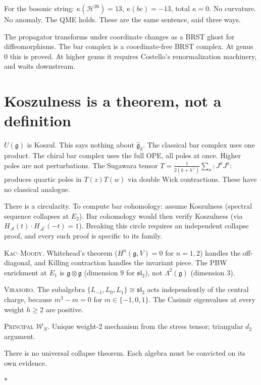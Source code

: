 \documentclass[11pt]{article}
\newcommand{\cA}{\mathcal{A}}
\newcommand{\cW}{\mathcal{W}}
\newcommand{\cH}{\mathcal{H}}
\newcommand{\fg}{\mathfrak{g}}
\newcommand{\fsl}{\mathfrak{sl}}
\newcommand{\normord}[1]{:\!#1\!:}
\newcommand{\sep}{\bigskip\begin{center}$*$\end{center}\medskip}
\begin{document}
For the bosonic string: $\kappa(\cH^{26}) = 13$,
$\kappa(bc) = -13$, total $\kappa = 0$.  No curvature.  No anomaly.
The QME holds.  These are the same sentence, said three ways.

The propagator transforms under coordinate changes as a BRST ghost
for diffeomorphisms.  The bar complex is a coordinate-free BRST
complex.  At genus~$0$ this is proved.  At higher genus it requires
Costello's renormalization machinery, and waits downstream.


\section{Koszulness is a theorem, not a definition}
\label{sec:koszulness}

$U(\fg)$ is Koszul.  This says nothing about $\widehat{\fg}_k$.
The classical bar complex uses one product.  The chiral bar complex
uses the full OPE, all poles at once.  Higher poles are not
perturbations.  The Sugawara tensor
$T = \frac{1}{2(k+h^\vee)}\sum_a \normord{J^a J^a}$ produces
quartic poles in $T(z)T(w)$ via double Wick contractions.  These
have no classical analogue.

There is a circularity.  To compute bar cohomology: assume Koszulness
(spectral sequence collapses at $E_2$).  Bar cohomology would then
verify Koszulness (via $H_\cA(t) \cdot H_{\cA^!}(-t) = 1$).
Breaking this circle requires an independent collapse proof, and
every such proof is specific to its family.

\textsc{Kac--Moody.}\enspace
Whitehead's theorem ($H^n(\fg, V) = 0$ for $n = 1,2$) handles
the off-diagonal, and Killing contraction handles the invariant
piece.  The PBW enrichment at $E_1$ is $\fg \otimes \fg$
(dimension $9$ for $\fsl_2$), not $\Lambda^2(\fg)$ (dimension $3$).

\textsc{Virasoro.}\enspace
The subalgebra $\{L_{-1}, L_0, L_1\} \cong \fsl_2$ acts
independently of the central charge, because $m^3 - m = 0$ for
$m \in \{-1, 0, 1\}$.  The Casimir eigenvalues at every weight
$h \geq 2$ are positive.

\textsc{Principal $\cW_N$.}\enspace
Unique weight-$2$ mechanism from the stress tensor; triangular
$d_2$ argument.

There is no universal collapse theorem.  Each algebra must be
convicted on its own evidence.

\sep
\end{document}
